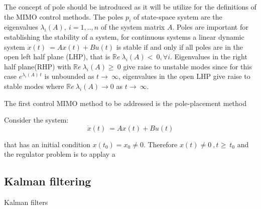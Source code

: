  The concept of pole should be introduced as it will be utilize for the definitions of the MIMO control methods. The poles $p_i$ of state-space system are the eigenvalues $\lambda_i(A),~i=1,..,n$ of the system matrix $A$. Poles are important for establishing the stability of a system, for continuous systems a linear dynamic system  $	\dot{x}(t)~=Ax(t)+Bu(t)$ is stable if and only if all poles are in the open left half plane (LHP), that is $\mathbb{R}e~{\lambda_i(A)}<~0, \forall i$. Eigenvalues in the right half plane(RHP) with  $\mathbb{R}e~{\lambda_i(A)}\geq~0$ give raise to unstable modes since for this case $e^{\lambda_i(A)~t}$ is unbounded as $t\rightarrow~\infty$,  eigenvalues in the open LHP give raise to stable modes where $\mathbb{R}e~{\lambda_i(A)} \rightarrow 0$ as $t\rightarrow~\infty$.
\smallskip

The first control MIMO method to be addressed  is the pole-placement method

Consider the system:
\begin{equation}
	\dot{x}(t)~=Ax(t)+Bu(t)
\end{equation} 

that has an initial condition $x(t_0)=x_0\neq 0$. Therefore $x(t) \neq 0~,t\geq ~t_0$ and the regulator problem is to applay a 
\subsection{Kalman filtering}

Kalman filters